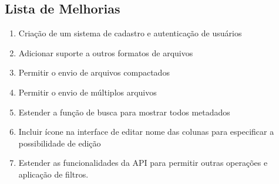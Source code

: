 
\begin{apendicesenv}
\partapendices






\chapter{Lista de Melhorias}
\label{apendiceB}

\begin{enumerate}  
    \item Criação de um sistema de cadastro e autenticação de usuários 
    \item Adicionar suporte a outros formatos de arquivos 
    \item Permitir o envio de arquivos compactados
    \item Permitir o envio de múltiplos arquivos
    \item Estender a função de busca para mostrar todos metadados
    \item Incluir ícone na interface de editar nome das colunas para especificar a possibilidade de edição
    \item Estender as funcionalidades da API para permitir outras operações e aplicação de filtros.
\end{enumerate}

\end{apendicesenv}
